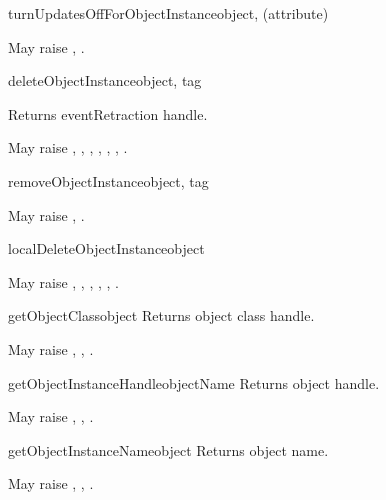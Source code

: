 \begin{methoddesc}{turnUpdatesOffForObjectInstance}{object, (attribute)}

May raise
,
.
\end{methoddesc}

\begin{methoddesc}{deleteObjectInstance}{object, tag}

Returns eventRetraction handle.

May raise
,
,
,
,
,
,
.
\end{methoddesc}

\begin{methoddesc}{removeObjectInstance}{object, tag}

May raise
,
.
\end{methoddesc}

\begin{methoddesc}{localDeleteObjectInstance}{object}

May raise
,
,
,
,
,
.
\end{methoddesc}

\begin{methoddesc}{getObjectClass}{object}
Returns object class handle.

May raise
,
,
.
\end{methoddesc}

\begin{methoddesc}{getObjectInstanceHandle}{objectName}
Returns object handle.

May raise
,
,
.
\end{methoddesc}

\begin{methoddesc}{getObjectInstanceName}{object}
Returns object name.

May raise
,
,
.
\end{methoddesc}

